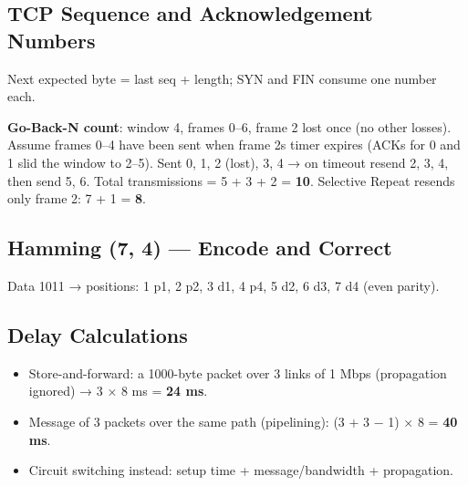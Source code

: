 \needspace{95pt}

\hypertarget{p2-09--143-tcp-sequence-and-acknowledgement-numbers}{%
\subsection{TCP Sequence and Acknowledgement Numbers}\label{p2-09--143-tcp-sequence-and-acknowledgement-numbers}}



Next expected byte = last seq + length; SYN and FIN consume one number each.

\textbf{Go-Back-N count}: window 4, frames 0--6, frame 2 lost once (no other losses). Assume frames 0--4 have been sent when frame 2\textquotesingle s timer expires (ACKs for 0 and 1 slid the window to 2--5).
Sent 0, 1, 2 (lost), 3, 4 → on timeout resend 2, 3, 4, then send 5, 6. Total transmissions = 5 + 3 + 2 = \textbf{10}. Selective Repeat resends only frame 2: 7 + 1 = \textbf{8}.

\needspace{125pt}

\hypertarget{p2-09--144-hamming-7-4--encode-and-correct}{%
\subsection{Hamming (7, 4) --- Encode and Correct}\label{p2-09--144-hamming-7-4--encode-and-correct}}

Data 1011 → positions: 1 p1, 2 p2, 3 d1, 4 p4, 5 d2, 6 d3, 7 d4 (even parity).



\needspace{95pt}

\hypertarget{p2-09--145-delay-calculations}{%
\subsection{Delay Calculations}\label{p2-09--145-delay-calculations}}

\begin{itemize}
\tightlist
\item
  Store-and-forward: a 1000-byte packet over 3 links of 1 Mbps (propagation ignored) → 3 × 8 ms = \textbf{24 ms}.
\item
  Message of 3 packets over the same path (pipelining): (3 + 3 − 1) × 8 = \textbf{40 ms}.
\item
  Circuit switching instead: setup time + message/bandwidth + propagation.
\end{itemize}

